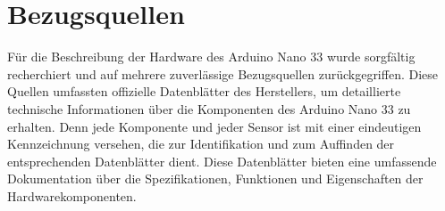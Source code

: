 \section{Bezugsquellen}
Für die Beschreibung der Hardware des Arduino Nano 33 wurde sorgfältig recherchiert und auf mehrere zuverlässige Bezugsquellen zurückgegriffen. Diese Quellen umfassten offizielle Datenblätter des Herstellers, um detaillierte technische Informationen über die Komponenten des Arduino Nano 33 zu erhalten. Denn jede Komponente und jeder Sensor ist mit einer eindeutigen Kennzeichnung versehen, die zur Identifikation und zum Auffinden der entsprechenden Datenblätter dient. Diese Datenblätter bieten eine umfassende Dokumentation über die Spezifikationen, Funktionen und Eigenschaften der Hardwarekomponenten.



